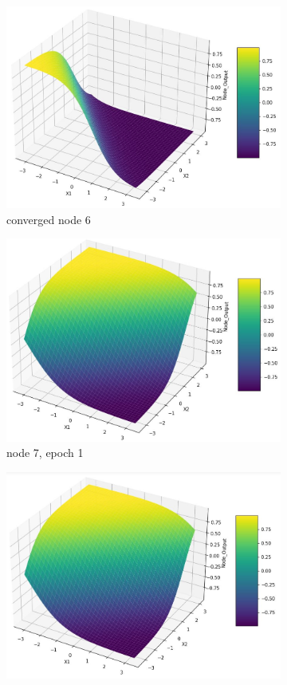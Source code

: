 \documentclass[11pt]{article}
\begin{document}
\begin{figure}[h!]
\begin{subfigure}[b]{0.45\textwidth}
	\includegraphics[scale=0.14]{hidden1_n6_c.jpg}
	\caption{converged node 6}
	\label{fig:fig2.1.5.10}
	\end{subfigure}
	\begin{subfigure}[b]{0.3\textwidth}
	\centering
	\includegraphics[scale=0.14]{hidden1_n7_e1.jpg}
	\caption{node 7, epoch 1}
	\label{fig:fig2.1.5.11}
	\end{subfigure}
	\begin{subfigure}[b]{0.3\textwidth}
	\centering
	\includegraphics[scale=0.14]{hidden1_n7_e5.jpg}

\end{subfigure}
\end{figure}
\end{document}
